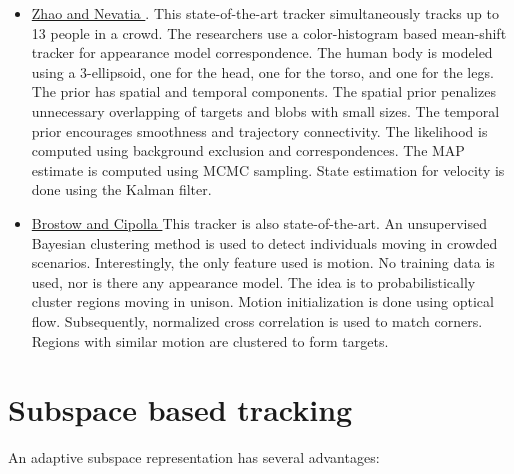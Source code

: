 \begin{Body}
\begin{itemize}
\item \underline{Zhao and Nevatia \cite{2004_CNF_TrackingPeople_Zhao}}.  This state-of-the-art tracker simultaneously tracks up to 13 people in a crowd.  The researchers use a color-histogram based mean-shift tracker for appearance model correspondence.  The human body is modeled using a 3-ellipsoid, one for the head, one for the torso, and one for the legs.  The prior has spatial and temporal components.  The spatial prior penalizes unnecessary overlapping of targets and blobs with small sizes.  The temporal prior encourages smoothness and trajectory connectivity.  The likelihood is computed using background exclusion and correspondences.  The MAP estimate is computed using MCMC sampling.  State estimation for velocity is done using the Kalman filter.

\item \underline{Brostow and Cipolla \cite{2006_CNF_TRKhuman_Brostow}}  This tracker is also state-of-the-art.  An unsupervised Bayesian clustering method is used to detect individuals moving in crowded scenarios.  Interestingly, the only feature used is motion.  No training data is used, nor is there any appearance model.  The idea is to probabilistically cluster regions moving in unison.  Motion initialization is done using optical flow.  Subsequently, normalized cross correlation is used to match corners.  Regions with similar motion are clustered to form targets.
\end{itemize}

\section{Subspace based tracking}
An adaptive subspace representation has several advantages:


\end{Body}
